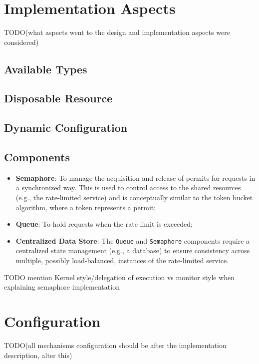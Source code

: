 \section{Implementation Aspects}\label{sec:rate-limiter-implementation}

TODO(what aspects went to the design and implementation aspects were considered)

\subsection{Available Types}\label{subsec:rate-limiter-available-types}

\subsection{Disposable Resource}\label{subsec:rate-limiter-disposable-resource}

\subsection{Dynamic Configuration}\label{subsec:rate-limiter-dynamic-configuration}

\subsection{Components}\label{subsec:rate-limiter-components}

\begin{itemize}
    \item \textbf{Semaphore}: To manage the acquisition and release of permits for requests in a synchronized way.
    This is used to control access to the shared resources (e.g., the rate-limited service) and is conceptually similar to the token bucket algorithm, where a token represents a permit;
    \item \textbf{Queue}: To hold requests when the rate limit is exceeded;
    \item \textbf{Centralized Data Store}: The \texttt{Queue} and \texttt{Semaphore} components require a centralized state management (e.g., a database) to ensure consistency across multiple, possibly load-balanced, instances of the rate-limited service.
\end{itemize}


TODO mention Kernel style/delegation of execution vs monitor style when explaining semaphore implementation

\section{Configuration}\label{sec:rate-limiter-configuration}

TODO(all mechanisms configuration should be after the implementation description, alter this)
